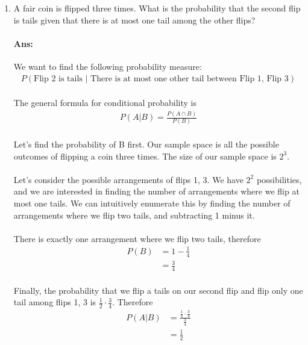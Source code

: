 \documentclass{article}
\begin{document}
\begin{enumerate}
    \item A fair coin is flipped three times. What is the probability that the second flip is tails
given that there is at most one tail among the other flips?
    
    \paragraph{Ans:}We want to find the following probability measure:
    \begin{align*}
        P(\text{Flip 2 is tails $|$ There is at most one other tail between Flip 1, Flip 3})
    \end{align*}

    \paragraph{}The general formula for conditional probability is
    \begin{align*}
        P(A \vert B) = \frac{P(A \cap B)}{P(B)}
    \end{align*}
    \paragraph{}Let's find the probability of B first. Our sample space is all the possible outcomes of flipping a coin
    three times. The size of our sample space is $2^3$. 


    \paragraph{}Let's consider the possible arrangements of flips 1, 3. We have $2^2$ possibilities, and we are
    interested in finding the number of arrangements where we flip at most one tails. 
    We can intuitively enumerate this by finding the number of arrangements where
    we flip two tails, and subtracting 1 minus it. 

    \paragraph{}There is exactly one arrangement where we flip two tails, therefore
    \begin{align*}
        P(B) &= 1 - \frac{1}{4}\\
             &= \frac{3}{4}
    \end{align*}
    \paragraph{}Finally, the probability that we flip a tails on our second flip and flip only one tail
    among flips 1, 3 is $\frac{1}{2}\cdot \frac{3}{4}$. Therefore
    \begin{align*}
        P(A \vert B) &= \frac{\frac{1}{2} \cdot \frac{3}{4}}{\frac{3}{4}}\\
                     &= \frac{1}{2}
    \end{align*}


\end{enumerate}
\end{document}
